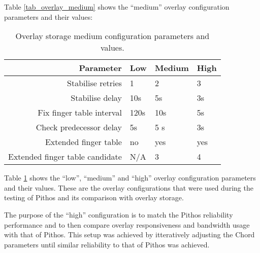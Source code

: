 Table \ref{tab_overlay_medium} shows the ``medium'' overlay configuration parameters and their values:
%
\begin{table}[htbp]
\centering
\begin{tabular}{|r|l|l|l|}
\hline
Parameter                       & Low  & Medium & High  \\
\hline
Stabilise retries               & 1    & 2      &  3    \\
Stabilise delay                 & 10s  & 5s     &  3s   \\
Fix finger table interval       & 120s & 10s    &  5s   \\
Check predecessor delay         & 5s   & 5 s    &  3s   \\
Extended finger table           & no   & yes    &  yes  \\
Extended finger table candidate & N/A  & 3      &  4    \\
\hline
\end{tabular}
\caption{Overlay storage medium configuration parameters and values.}
\label{tab_overlay_configs}
\end{table}

Table \ref{tab_overlay_configs} shows the ``low'', ``medium'' and ``high'' overlay configuration parameters and their values. These are the overlay configurations that were used during the testing of Pithos and its comparison with overlay storage.

The purpose of the ``high'' configuration is to match the Pithos reliability performance and to then compare overlay responsiveness and bandwidth usage with that of Pithos. This setup was achieved by itteratively adjusting the Chord parameters until similar reliability to that of Pithos was achieved.

